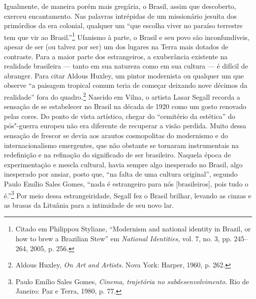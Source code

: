 Igualmente, de maneira porém mais gregária, o Brasil, assim que
descoberto, exerceu encantamento. Nas palavras intrépidas de um
missionário jesuíta dos primórdios da era colonial, qualquer um ``que
escolha viver no paraíso terrestre tem que vir ao Brasil.''\footnote{Citado
  em Philippou Styliane, ``Modernism and national identity in Brazil, or
  how to brew a Brazilian Stew'' em \textit{National Identities,} vol. 7,
  no. 3, pp. 245--264, 2005, p. 256.} Ufanismo à parte, o Brasil e seu
povo são inconfundíveis, apesar de ser (ou talvez por ser) um dos
lugares na Terra mais dotados de contraste. Para a maior parte dos
estrangeiros, a exuberância existente na realidade brasileira --- tanto em
sua natureza como em sua cultura --- é difícil de abranger. Para citar
Aldous Huxley, um pintor modernista ou qualquer um que observe ``a
paisagem tropical comum teria de começar deixando nove décimos da
realidade'' fora do quadro.\footnote{Aldous Huxley, \textit{On Art and
  Artists}. Nova York: Harper, 1960, p. 262.} Nascido em Vilna, o artista
Lasar Segall recorda a sensação de se estabelecer no Brasil na década de
1920 como um gosto renovado pelas cores. Do ponto de vista artístico,
chegar do ``cemitério da estética'' do pós"-guerra europeu não era
diferente de recuperar a visão perdida. Muito dessa sensação de frescor
se devia aos arautos cosmopolitas do modernismo e do internacionalismo
emergentes, que não obstante se tornaram instrumentais na redefinição e
na refinação do significado de ser brasileiro. Naquela época de
experimentação e mescla cultural, havia sempre algo inesperado no
Brasil, algo inesperado por ansiar, posto que, ``na falta de uma cultura
original'', segundo Paulo Emílio Sales Gomes, ``nada é estrangeiro para
nós {[}brasileiros{]}, pois tudo o é.''\footnote{Paulo Emílio
Sales Gomes, \textit{Cinema, trajetória no subdesenvolvimento}. Rio de
Janeiro: Paz e Terra, 1980, p. 77.} Por meio dessa estrangeiridade,
Segall fez o Brasil brilhar, levando as cinzas e as brasas da Lituânia
para a intimidade de seu novo lar.

